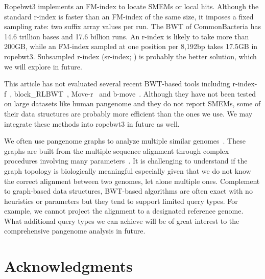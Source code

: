\documentclass[webpdf,contemporary,large,namedate]{oup-authoring-template}%
\begin{document}

Ropebwt3 implements an FM-index to locate SMEMs or local hits.
Although the standard r-index is faster than an FM-index of the same size,
it imposes a fixed sampling rate: two suffix array values per run.
The BWT of CommonBacteria has 14.6 trillion bases and 17.6 billion runs.
An r-index is likely to take more than 200GB,
while an FM-index sampled at one position per 8,192bp takes 17.5GB in ropebwt3.
Subsampled r-index (sr-index; \citealt*{DBLP:journals/corr/abs-2409-14654}) is probably the better solution, which we will explore in future.

This article has not evaluated several recent BWT-based tools including
r-index-f~\citep{DBLP:conf/wea/BrownG022}, block\_RLBWT~\citep{DBLP:conf/wea/Diaz-DominguezD23}, Move-r~\citep{DBLP:conf/wea/Bertram0N24} and b-move~\citep{DBLP:conf/wabi/DepuydtRVVGF24}.
Although they have not been tested on large datasets like human pangenome and they do not report SMEMs,
some of their data structures are probably more efficient than the ones we use.
We may integrate these methods into ropebwt3 in future as well.

We often use pangenome graphs to analyze multiple similar genomes~\citep{Liao:2023aa}.
These graphs are built from the multiple sequence alignment through complex procedures involving many parameters~\citep{Li:2020aa,Hickey:2023aa,Garrison:2024aa}.
It is challenging to understand if the graph topology is biologically meaningful especially given that we do not know the correct alignment between two genomes, let alone multiple ones.
Complement to graph-based data structures, BWT-based algorithms are often exact with no heuristics or parameters but they tend to support limited query types.
For example, we cannot project the alignment to a designated reference genome.
What additional query types we can achieve will be of great interest to the comprehensive pangenome analysis in future.

\section*{Acknowledgments}
\end{document}
